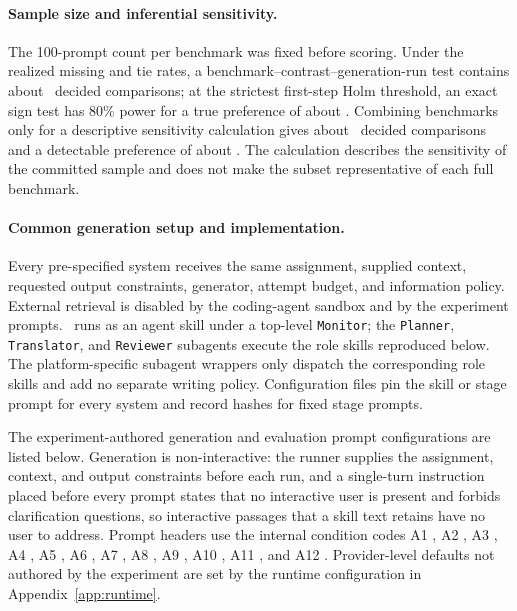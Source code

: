 \paragraph{Sample size and inferential sensitivity.}
The 100-prompt count per benchmark was fixed before scoring.
Under the realized missing and tie rates, a benchmark--contrast--generation-run test contains about \PowerCellDecided\ decided comparisons; at the strictest first-step Holm threshold, an exact sign test has 80\% power for a true preference of about \PowerCellDetectablePreference.
Combining benchmarks only for a descriptive sensitivity calculation gives about \PowerPooledDecided\ decided comparisons and a detectable preference of about \PowerPooledDetectablePreference.
The calculation describes the sensitivity of the committed sample and does not make the subset representative of each full benchmark.

\paragraph{Common generation setup and implementation.}
Every pre-specified system receives the same assignment, supplied context, requested output constraints, generator, attempt budget, and information policy.
External retrieval is disabled by the coding-agent sandbox and by the experiment prompts.
\condAgenticCogWriter\ runs as an agent skill under a top-level \texttt{Monitor}; the \texttt{Planner}, \texttt{Translator}, and \texttt{Reviewer} subagents execute the role skills reproduced below.
The platform-specific subagent wrappers only dispatch the corresponding role skills and add no separate writing policy.
Configuration files pin the skill or stage prompt for every system and record hashes for fixed stage prompts.

The experiment-authored generation and evaluation prompt configurations are listed below.
Generation is non-interactive: the runner supplies the assignment, context, and output constraints before each run, and a single-turn instruction placed before every prompt states that no interactive user is present and forbids clarification questions, so interactive passages that a skill text retains have no user to address.
Prompt headers use the internal condition codes A1 \condSinglePass, A2 \condStaged, A3 \condTaskPlanning, A4 \condAgenticCogWriter, A5 \condNoGoals, A6 \condFixedOrder, A7 \condSingleWriter, A8 \condSingleContext, A9 \condStagedRoles, A10 \condSelfRefine, A11 \condPlainAgent, and A12 \condLoopOnly.
Provider-level defaults not authored by the experiment are set by the runtime configuration in Appendix~\ref{app:runtime}.

